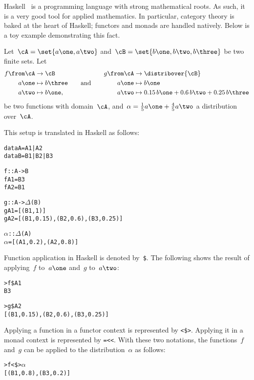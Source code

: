 \begin{example}
Haskell~\cite{www.haskell.org} is a programming language with strong mathematical roots.
As such, it is a very good tool for applied mathematics.
In particular, category theory is baked at the heart of Haskell; functors and monads are handled natively.
Below is a toy example demonstrating this fact.

Let~\(\cA = \set{a\one, a\two}\) and~\(\cB = \set{b\one, b\two, b\three}\) be two finite sets. Let
\[
\begin{split}
\begin{aligned}
f \from \cA &\to \cB \\
a\one &\mapsto b\three \\
a\two &\mapsto b\one,
\end{aligned}
\end{split}
\qquad\text{and}\qquad
\begin{split}
\begin{aligned}
g \from \cA &\to \distribover{\cB} \\
a\one &\mapsto b\one \\
a\two &\mapsto 0.15 \, b\one + 0.6 \, b\two + 0.25 \, b\three
\end{aligned}
\end{split}
\]
be two functions with domain~\(\cA\), and~\(\alpha = \frac{1}{5} a\one + \frac{4}{5} a\two\) a distribution over~\(\cA\).

This setup is translated in Haskell as follows:
\begin{alltt}
data A = A1 | A2
data B = B1 | B2 | B3

f :: A  -> B
f    A1 =  B3
f    A2 =  B1

g :: A  -> \(\Delta\)(B)
g    A1 =  [(B1, 1)]
g    A2 =  [(B1, 0.15), (B2, 0.6), (B3, 0.25)]

\(\alpha\) :: \(\Delta\)(A)
\(\alpha\) =  [(A1, 0.2), (A2, 0.8)]
\end{alltt}

Function application in Haskell is denoted by~\texttt{\$}.
The following shows the result of applying~\(f\) to~\(a\one\) and~\(g\) to~\(a\two\):
\begin{alltt}
> f \$ A1
B3

> g \$ A2
[(B1, 0.15), (B2, 0.6), (B3, 0.25)]
\end{alltt}

Applying a function in a functor context is represented by \texttt{<\$>}.
Applying it in a monad context is represented by \texttt{=<<}.
With these two notations, the functions~\(f\) and~\(g\) can be applied to the distribution~\(\alpha\) as follows:
\begin{alltt}
> f <\$> \(\alpha\)
[(B1, 0.8), (B3, 0.2)]


\end{alltt}
\end{example}
